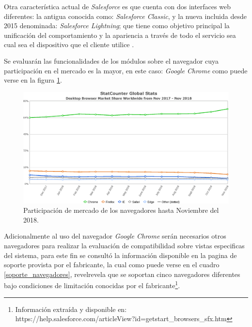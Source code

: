 Otra característica actual de \emph{Salesforce} es que cuenta con dos interfaces
web diferentes: la antigua conocida como: \emph{Salesforce Classic}, y la nueva
incluida desde 2015 denominada: \emph{Salesforce Lightning}; que tiene como
objetivo principal la unificación del comportamiento y la apariencia a través de
todo el servicio sea cual sea el dispositivo que el cliente
utilice \cite{McCarthy}.

Se evaluarán las funcionalidades de los módulos sobre el navegador cuya
participación en el mercado es la mayor, en este caso: \emph{Google Chrome}
como puede verse en la figura \ref{software}.

\begin{figure}
\centering
\includegraphics[width=1.0\textwidth]{graphics/compatibilidad.eps}
\caption{Participación de mercado de los navegadores hasta Noviembre del 2018.}
\label{software}
\end{figure}

Adicionalmente al uso del navegador \emph{Google Chrome} serán necesarios
otros navegadores para realizar la evaluación de compatibilidad sobre
vistas especificas del sistema, para este fin se consultó la información
disponible en la pagina de soporte provista por el fabricante, la cual como
puede verse en el cuadro \ref{soporte_navegadores}, revelrevela que se soportan
cinco navegadores diferentes bajo condiciones de limitación conocidas por el
fabricante\footnote{Información extraída y disponible en:
https://help.salesforce.com/articleView?id=getstart\_browsers\_sfx.htm}.

